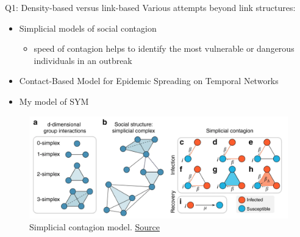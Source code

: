 \begin{frame}{Q1: Density-based versus link-based}
    Various attempts beyond link structures:
    \begin{itemize}
        \item Simplicial models of social contagion
        \begin{itemize}
            \item speed of contagion helps to identify the most vulnerable or dangerous individuals in an outbreak
        \end{itemize}
        \item Contact-Based Model for Epidemic Spreading on Temporal Networks\cite{PhysRevX.9.031017}
        \item My model of SYM
    \end{itemize}
    \begin{figure}
        \centering
        \includegraphics[width = 0.9\linewidth]{Pics/simplicial.png}
        \caption{Simplicial contagion model. \href{https://www.nature.com/articles/s41467-019-10431-6}{Source}}
        \label{fig:my_label}
    \end{figure}
\end{frame}

